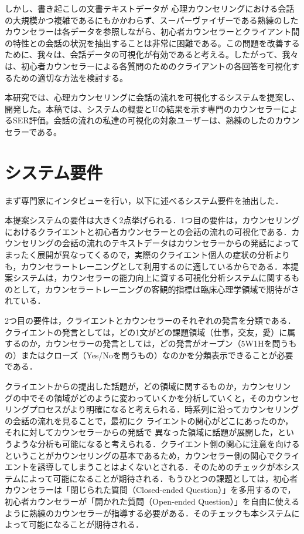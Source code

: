 \documentclass[shuuron]{kuee}
\begin{document}
  しかし、書き起こしの文書テキストデータが 心理カウンセリングにおける会話の大規模かつ複雑であるにもかかわらず、スーパーヴァイザーである熟練のしたカウンセラーは各データを参照しながら、初心者カウンセラーとクライアント間の特性との会話の状況を抽出することは非常に困難である。この問題を改善するために、我々は、会話データの可視化が有効であると考える。したがって、我々は、初心者カウンセラーによる各質問のためのクライアントの各回答を可視化するための適切な方法を検討する。

  本研究では、心理カウンセリングに会話の流れを可視化するシステムを提案し、開発した。本稿では、システムの概要とUの結果を示す専門のカウンセラーによるSER評価。会話の流れの私達の可視化の対象ユーザーは、熟練のしたのカウンセラーである。




\section{システム要件}




まず専門家にインタビューを行い，以下に述べるシステム要件を抽出した．




本提案システムの要件は大きく2点挙げられる．1つ目の要件は，カウンセリングにおけるクライエントと初心者カウンセラーとの会話の流れの可視化である．カウンセリングの会話の流れのテキストデータはカウンセラーからの発話によってまったく展開が異なってくるので，実際のクライエント個人の症状の分析よりも，カウンセラートレーニングとして利用するのに適しているからである．本提案システムは，カウンセラーの能力向上に資する可視化分析システムに関するものとして，カウンセラートレーニングの客観的指標は臨床心理学領域で期待がされている．


2つ目の要件は，クライエントとカウンセラーのそれぞれの発言を分類である．クライエントの発言としては，どの1文がどの課題領域（仕事，交友，愛）に属するのか，カウンセラーの発言としては，どの発言がオープン（5W1Hを問うもの）またはクローズ（Yes/Noを問うもの）なのかを分類表示できることが必要である．

クライエントからの提出した話題が，どの領域に関するものか，カウンセリン
グの中でその領域がどのように変わっていくかを分析していくと，そのカウンセ
リングプロセスがより明確になると考えられる．時系列に沿ってカウンセリングの会話の流れを見ることで，最初にク
ライエントの関心がどこにあったのか，それに対してカウンセラーからの発話で
異なった領域に話題が展開した，というような分析も可能になると考えられる．クライエント側の関心に注意を向けるということがカウンセリングの基本であるため，カウンセラー側の関心でクライエントを誘導してしまうことはよくないとされる．そのためのチェックが本システムによって可能になることが期待される．もうひとつの課題としては，初心者カウンセラーは「閉じられた質問（Closed-ended Question）」を多用するので，初心者カウンセラーが「開かれた質問（Open-ended Question）」を自由に使えるように熟練のカウンセラーが指導する必要がある．そのチェックも本システムによって可能になることが期待される．
\end{document}
